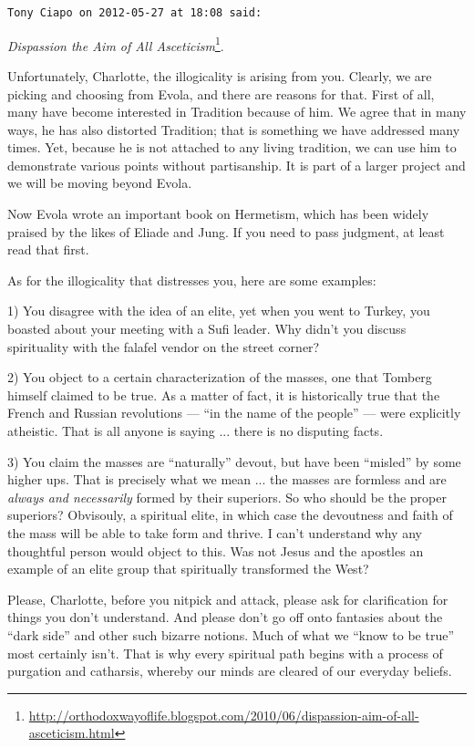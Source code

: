 \begin{footnotesize}
\begin{sffamily}
\hfill

\texttt{Tony Ciapo on 2012-05-27 at 18:08 said:}

\textit{Dispassion the Aim of All Asceticism}\footnote{\url{http://orthodoxwayoflife.blogspot.com/2010/06/dispassion-aim-of-all-asceticism.html}}.

Unfortunately, Charlotte, the illogicality is arising from you. Clearly, we are picking and choosing from Evola, and there are reasons for that. First of all, many have become interested in Tradition because of him. We agree that in many ways, he has also distorted Tradition; that is something we have addressed many times. Yet, because he is not attached to any living tradition, we can use him to demonstrate various points without partisanship. It is part of a larger project and we will be moving beyond Evola.

Now Evola wrote an important book on Hermetism, which has been widely praised by the likes of Eliade and Jung. If you need to pass judgment, at least read that first.

As for the illogicality that distresses you, here are some examples:

1) You disagree with the idea of an elite, yet when you went to Turkey, you boasted about your meeting with a Sufi leader. Why didn't you discuss spirituality with the falafel vendor on the street corner?

2) You object to a certain characterization of the masses, one that Tomberg himself claimed to be true. As a matter of fact, it is historically true that the French and Russian revolutions --- ``in the name of the people'' --- were explicitly atheistic. That is all anyone is saying ... there is no disputing facts.

3) You claim the masses are ``naturally'' devout, but have been ``misled'' by some higher ups. That is precisely what we mean ... the masses are formless and are \emph{always and necessarily} formed by their superiors. So who should be the proper superiors? Obvisouly, a spiritual elite, in which case the devoutness and faith of the mass will be able to take form and thrive. I can't understand why any thoughtful person would object to this. Was not Jesus and the apostles an example of an elite group that spiritually transformed the West?

Please, Charlotte, before you nitpick and attack, please ask for clarification for things you don't understand. And please don't go off onto fantasies about the ``dark side'' and other such bizarre notions. Much of what we ``know to be true'' most certainly isn't. That is why every spiritual path begins with a process of purgation and catharsis, whereby our minds are cleared of our everyday beliefs.


\end{sffamily}
\end{footnotesize}
